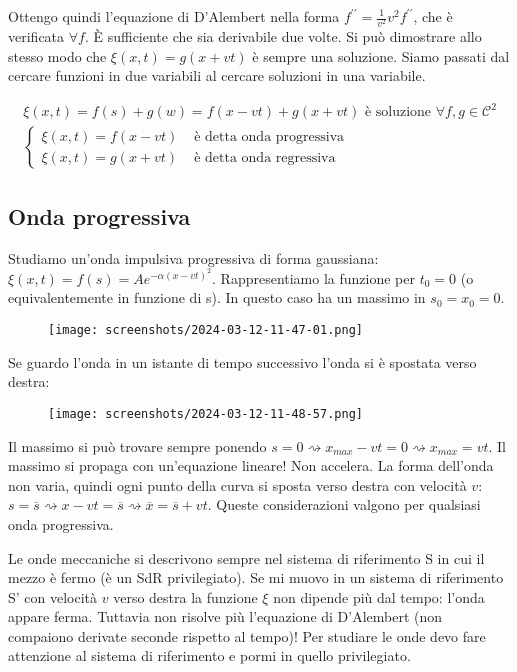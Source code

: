 Ottengo quindi l'equazione di D'Alembert nella forma \(f^{\prime\prime} = \frac{1}{v^{2} } v ^{2} f^{\prime\prime} \), che è verificata \(\forall f\). È sufficiente che sia derivabile due volte. Si può dimostrare allo stesso modo che \(\xi (x,t) = g(x+vt)\) è sempre una soluzione. Siamo passati dal cercare funzioni in due variabili al cercare soluzioni in una variabile.

\begin{gather*}
	\xi (x,t) = f(s) + g(w) = f(x-vt) + g(x+vt) \text{ è soluzione } \forall f,g \in \mathcal{C} ^{2}  \\
	\begin{cases}
		\xi (x,t) = f(x-vt) &\text{ è detta onda progressiva}\\
		\xi (x,t) = g(x+vt) &\text{ è detta onda regressiva} 
	\end{cases}
\end{gather*}

\subsection{Onda progressiva}

Studiamo un'onda impulsiva progressiva di forma gaussiana: \(\xi (x,t) = f(s) = A e^{- \alpha (x-vt)^{2} }\). Rappresentiamo la funzione per \(t_0=0\) (o equivalentemente in funzione di s). In questo caso ha un massimo in \(s_0 = x_0 = 0\).
\begin{figure}[H]
	\centering
	\texttt{[image: screenshots/2024-03-12-11-47-01.png]}
\end{figure}
Se guardo l'onda in un istante di tempo successivo l'onda si è spostata verso destra:
\begin{figure}[H]
	\centering
	\texttt{[image: screenshots/2024-03-12-11-48-57.png]}
\end{figure}
Il massimo si può trovare sempre ponendo \(s=0 \rightsquigarrow x_{max} - vt = 0 \rightsquigarrow x_{max} = vt  \). Il massimo si propaga con un'equazione lineare! Non accelera. La forma dell'onda non varia, quindi ogni punto della curva si sposta verso destra con velocità \(v\): \(s = \overline{s} \rightsquigarrow x-vt = \overline{s} \rightsquigarrow \overline{x} = \overline{s} + vt \). Queste considerazioni valgono per qualsiasi onda progressiva.

Le onde meccaniche si descrivono sempre nel sistema di riferimento S in cui il mezzo è fermo (è un SdR privilegiato). Se mi muovo in un sistema di riferimento S' con velocità \(v\) verso destra la funzione \(\xi \) non dipende più dal tempo: l'onda appare ferma. Tuttavia non risolve più l'equazione di D'Alembert (non compaiono derivate seconde rispetto al tempo)! Per studiare le onde devo fare attenzione al sistema di riferimento e pormi in quello privilegiato.

